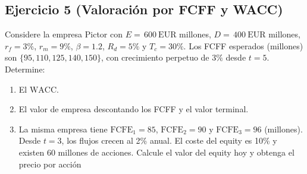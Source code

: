 \documentclass[12pt,a4paper]{article}
\newcommand{\EUR}[1]{\ensuremath{#1~\text{EUR}}}
\newenvironment{ejercicio}[1]{\subsection*{Ejercicio #1}}{}
\begin{document}
\begin{ejercicio}{5 (Valoración por FCFF y WACC)}
Considere la empresa Pictor con $E=\,\EUR{600}$ millones, $D=\,\EUR{400}$ millones, $r_f=3\%$, $r_m=9\%$, $\beta=1.2$, $R_d=5\%$ y $T_c=30\%$. Los FCFF esperados (millones) son $\{95,110,125,140,150\}$, con crecimiento perpetuo de $3\%$ desde $t=5$. Determine:
\begin{enumerate}[label=\alph*)]
  \item El $\text{WACC}$.
  \item El valor de empresa descontando los FCFF y el valor terminal.
  \item La misma empresa tiene $\text{FCFE}_1=85$, $\text{FCFE}_2=90$ y $\text{FCFE}_3=96$ (millones). Desde $t=3$, los flujos crecen al 2\% anual. El coste del equity es 10\% y existen 60 millones de acciones. Calcule el valor del equity hoy y obtenga el precio por acción
\end{enumerate}
\end{ejercicio}
\end{document}
